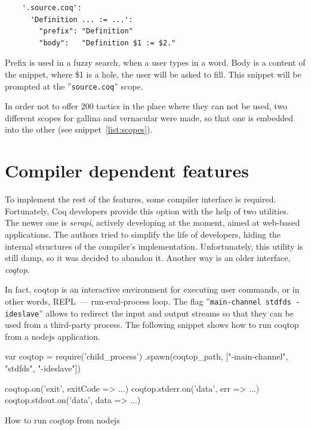 \vspace{1em}
\begin{lstlisting}
    '.source.coq':
      'Definition ... := ...':
        "prefix": "Definition"
        "body":   "Definition $1 := $2."
\end{lstlisting}

\vspace{1em}
Prefix is used in a fuzzy search, when a user types in a word. Body is a content of the snippet, where \$1 is a hole, the user will be asked to fill. This snippet will be prompted at the ''\texttt{source.coq}'' scope.

In order not to offer 200 tactics in the place where they can not be used, two different scopes for gallina and vernacular were made, so that one is embedded into the other (see snippet~\ref{list:scopes}).

\section{Compiler dependent features}

To implement the rest of the features, some compiler interface is required. Fortunately, Coq developers provide this option with the help of two utilities. The newer one is {\em serapi}, actively developing at the moment, aimed at web-based applications. The authors tried to simplify the life of developers, hiding the internal structures of the compiler's implementation. Unfortunately, this utility is still damp, so it was decided to abandon it. Another way is an older interface, {\em coqtop}.

In fact, coqtop is an interactive environment for executing user commands, or in other words, REPL~--- run-eval-process loop. The flag ''\mbox{\texttt{main-channel stdfds -ideslave}}'' allows to  redirect the input and output streams so that they can be used from a third-party process. The following snippet shows how to run coqtop from a nodejs application.\\


\begin{ListingEnv}[H]
\begin{Verb}

var coqtop = require('child_process')
    .spawn(coqtop_path, ["-main-channel", "stdfds", "-ideslave"])
    
coqtop.on('exit', exitCode => ...)
coqtop.stderr.on('data', err => ...)
coqtop.stdout.on('data', data => ...)
\end{Verb}
\caption{How to run coqtop from nodejs}
\label{list:nodejs-run-coq}
\end{ListingEnv}

